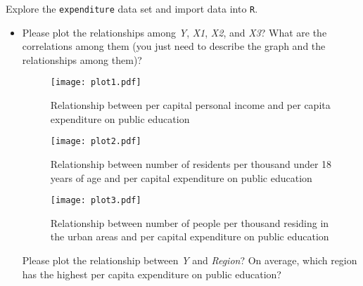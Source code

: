 \documentclass[12pt,letterpaper]{article}
\begin{document}
	\vspace{.5cm}
	\noindent Explore the \texttt{expenditure} data set and import data into \texttt{R}.
	\vspace{.5cm}
	  
	\vspace{.5cm}
	\begin{itemize}
		
		\item
		Please plot the relationships among \emph{Y}, \emph{X1}, \emph{X2}, and \emph{X3}? What are the correlations among them (you just need to describe the graph and the relationships among them)?
		
			\vspace{.5cm}
		
		   \begin{figure}\centering
			\caption{Relationship between per capital personal income and per capita expenditure on public education}
			\texttt{[image: plot1.pdf]}
		   \end{figure}
	
			\vspace{.5cm}
			
			\begin{figure}\centering
				\caption{Relationship between number of residents per thousand under 18 years of age and per capital expenditure on public education}
				\texttt{[image: plot2.pdf]}
			\end{figure}
		
				\vspace{.5cm}
				
			\begin{figure}\centering
			\caption{Relationship between number of people per thousand residing in the urban areas and per capital expenditure on public education}
			\texttt{[image: plot3.pdf]}
		   \end{figure}
	
	
	  
				\vspace{.5cm}
				
			
		
		Please plot the relationship between \emph{Y} and \emph{Region}? On average, which region has the highest per capita expenditure on public education?\\
		
		
		
			 
			

\end{itemize}
\end{document}
